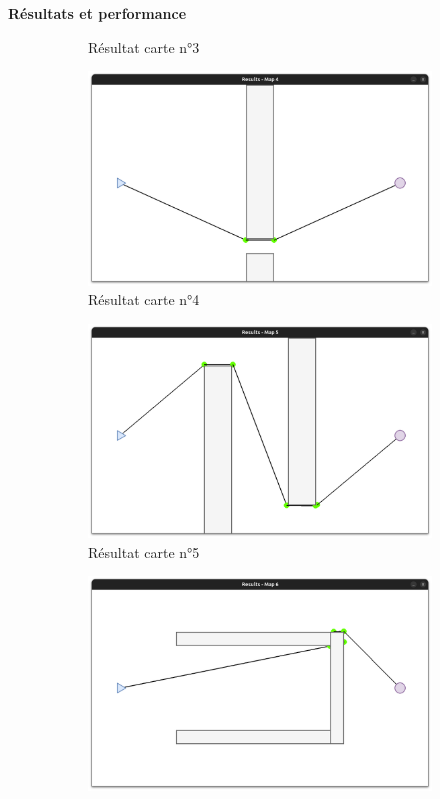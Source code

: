 \documentclass[aspectratio=169,10pt]{beamer}
\begin{document}
\begin{frame}{\textbf{Résultats et performance}}
\begin{figure}[H]
\begin{subfigure}[b]{0.24\textwidth}
			\caption*{Résultat carte n°3}
			\label{fig:rmap3}
		\end{subfigure}
		\hfill
		\begin{subfigure}[b]{0.24\textwidth}
			\centering
			\includegraphics[width=\textwidth]{IMAGES/rmap4.png}
			\caption*{Résultat carte n°4}
			\label{fig:rmap4}
		\end{subfigure}
		\vfill
		\begin{subfigure}[b]{0.24\textwidth}
			\centering
			\includegraphics[width=\textwidth]{IMAGES/rmap5.png}
			\caption*{Résultat carte n°5}
			\label{fig:rmap5}
		\end{subfigure}
		\hfill
		\begin{subfigure}[b]{0.24\textwidth}
			\centering
			\includegraphics[width=\textwidth]{IMAGES/rmap6.png}

\end{subfigure}
\end{figure}
\end{frame}
\end{document}
